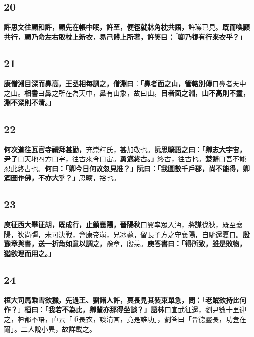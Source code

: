 \subsection*{20}

\textbf{許思文往顧和許，顧先在帳中眠，許至，便徑就牀角枕共語，}{\footnotesize 許璪已見。}\textbf{既而喚顧共行，顧乃命左右取枕上新衣，易己體上所著，許笑曰：「卿乃復有行來衣乎？」}

\subsection*{21}

\textbf{康僧淵目深而鼻高，王丞相每調之，僧淵曰：「鼻者面之山，}{\footnotesize \textbf{管輅別傳}曰鼻者天中之山。\textbf{相書}曰鼻之所在為天中，鼻有山象，故曰山。}\textbf{目者面之淵，山不高則不靈，淵不深則不清。」}

\subsection*{22}

\textbf{何次道往瓦官寺禮拜甚勤，}{\footnotesize 充崇釋氏，甚加敬也。}\textbf{阮思曠語之曰：「卿志大宇宙，}{\footnotesize \textbf{尹子}曰天地四方曰宇，往古來今曰宙。}\textbf{勇邁終古。」}{\footnotesize 終古，往古也。\textbf{楚辭}曰吾不能忍此終古也。}\textbf{何曰：「卿今日何故忽見推？」阮曰：「我圖數千戶郡，尚不能得，卿迺圖作佛，不亦大乎？」}{\footnotesize 思曠，裕也。}

\subsection*{23}

\textbf{庾征西大舉征胡，既成行，止鎮襄陽，}{\footnotesize \textbf{晉陽秋}曰翼率眾入沔，將謀伐狄，既至襄陽，狄尚彊，未可決戰，會康帝崩，兄冰薨，留長子方之守襄陽，自馳還夏口。}\textbf{殷豫章與書，送一折角如意以調之，}{\footnotesize 豫章，殷羡。}\textbf{庾答書曰：「得所致，雖是敗物，猶欲理而用之。」}

\subsection*{24}

\textbf{桓大司馬乘雪欲獵，先過王、劉諸人許，真長見其裝束單急，問：「老賊欲持此何作？」桓曰：「我若不為此，卿輩亦那得坐談？」}{\footnotesize \textbf{語林}曰宣武征還，劉尹數十里迎之，桓都不語，直云「垂長衣，談清言，竟是誰功」，劉答曰「晉德靈長，功豈在爾」。二人說小異，故詳載之。}

